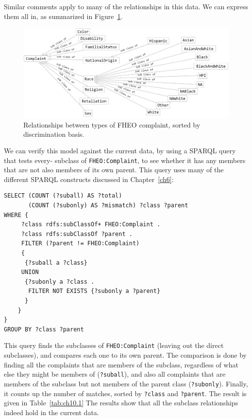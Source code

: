 Similar comments apply to many of the relationships in this data. We can
express them all in, as summarized in Figure~\ref{fig:ch10.1}.

\begin{figure}
\centering
\includegraphics[width=5in]{SWWOv3/media/ch10/figure10-4.png}
\caption{Relationships between types of FHEO complaint, sorted by discrimination basis.}
\label{fig:ch10.1}
\end{figure}



We can verify this model against the current data, by using a SPARQL
query that tests every- subclass of \texttt{FHEO:Complaint}, to see whether it
has any members that are not also members of its own parent. This query
uses many of the different SPARQL constructs discussed in Chapter~\ref{ch6}:

\begin{lstlisting}
SELECT (COUNT (?suball) AS ?total) 
       (COUNT (?subonly) AS ?mismatch) ?class ?parent
WHERE {
     ?class rdfs:subClassOf+ FHEO:Complaint .
     ?class rdfs:subClassOf ?parent .
     FILTER (?parent != FHEO:Complaint)
     {
      {?suball a ?class}
     UNION
      {?subonly a ?class .
       FILTER NOT EXISTS {?subonly a ?parent}
      }
    }
}
GROUP BY ?class ?parent
\end{lstlisting}

This query finds the subclasses of \texttt{FHEO:Complaint} (leaving out the
direct subclasses), and compares each one to its own parent. The
comparison is done by finding all the complaints that are members of the
subclass, regardless of what else they might be members of (\texttt{?suball}),
and also all complaints that are members of the subclass but not members
of the parent class (\texttt{?subonly}). Finally, it counts up the number of
matches, sorted by \texttt{?class} and \texttt{?parent}. The result is given in Table~\ref{tab:ch10.1}
The results show that all the subclass relationships indeed hold in the
current data.


